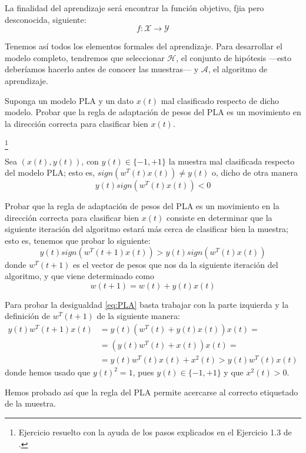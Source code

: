 \documentclass[a4paper, 11pt]{article}
\begin{document}
\begin{solucion}
        La finalidad del aprendizaje será encontrar la función objetivo, fjia pero desconocida, siguiente:
        \[
        f \colon \mathcal{X} \to \mathcal{Y}
        \]

        Tenemos así todos los elementos formales del aprendizaje. Para desarrollar el modelo completo, tendremos que seleccionar $\mathcal{H}$, el conjunto de hipótesis ---esto deberíamos hacerlo antes de conocer las muestras--- y $\mathcal{A}$, el algoritmo de aprendizaje.
    \end{solucion}

    \begin{ejercicio}
        Suponga un modelo PLA y un dato $x(t)$ mal clasificado respecto de dicho modelo. Probar que la regla de adaptación de pesos del PLA es un movimiento en la dirección correcta para clasificar bien $x(t)$.
    \end{ejercicio}

    \begin{solucion}\footnote{Ejercicio resuelto con la ayuda de los pasos explicados en el Ejercicio 1.3 de \cite{mostafa2012learning}.}

        Sea $(x(t), y(t))$, con $y(t) \in \{-1, +1\}$ la muestra mal clasificada respecto del modelo PLA; esto es, $sign(w^T(t) x(t)) \neq y(t)$ o, dicho de otra manera
        \[
        y(t) sign(w^T(t) x(t)) < 0
        \]

        Probar que la regla de adaptación de pesos del PLA es un movimiento en la dirección correcta para clasificar bien $x(t)$ consiste en determinar que la siguiente iteración del algoritmo estará más cerca de clasificar bien la muestra; esto es, tenemos que probar lo siguiente:
        \begin{equation}
            y(t) sign(w^T(t+1) x(t)) > y(t) sign(w^T(t) x(t))
            \label{eq:PLA}
        \end{equation}
        donde $w^T(t+1)$ es el vector de pesos que nos da la siguiente iteración del algoritmo, y que viene determinado como
        \[
        w(t+1) = w(t) + y(t)x(t)
        \]

        Para probar la desigualdad \ref{eq:PLA} basta trabajar con la parte izquierda y la definición de $w^T(t+1)$ de la siguiente manera:
        \begin{align*}
            y(t) w^T(t+1) x(t) &= y(t) (w^T(t) + y(t)x(t)) x(t) = \\
            &= (y(t)w^T(t) + x(t)) x(t) = \\
            &= y(t)w^T(t)x(t) + x^2(t) > y(t)w^T(t)x(t)
        \end{align*}
        donde hemos usado que $y(t)^2 = 1$, pues $y(t) \in \{-1, +1\}$ y que $x^2(t) > 0$.

        Hemos probado así que la regla del PLA permite acercarse al correcto etiquetado de la muestra.
    \end{solucion}
\end{document}
